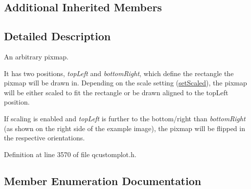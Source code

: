 \subsection*{Additional Inherited Members}


\subsection{Detailed Description}
An arbitrary pixmap. 

 It has two positions, {\itshape top\+Left} and {\itshape bottom\+Right}, which define the rectangle the pixmap will be drawn in. Depending on the scale setting (\hyperlink{class_q_c_p_item_pixmap_ab4d44529a1c6c8d37d0ea7560e042777}{set\+Scaled}), the pixmap will be either scaled to fit the rectangle or be drawn aligned to the top\+Left position.

If scaling is enabled and {\itshape top\+Left} is further to the bottom/right than {\itshape bottom\+Right} (as shown on the right side of the example image), the pixmap will be flipped in the respective orientations. 

Definition at line 3570 of file qcustomplot.\+h.



\subsection{Member Enumeration Documentation}
\hypertarget{class_q_c_p_item_pixmap_a0ea7f65edb7395e02de521915f221174}{}
